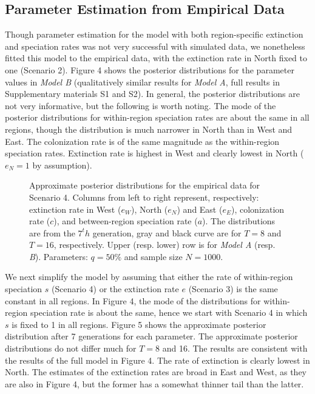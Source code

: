 \subsection*{Parameter Estimation from Empirical Data}
\noindent Though parameter estimation for the model with both region-specific extinction and speciation rates was not very successful with simulated data, we nonetheless fitted this model to the empirical data, with the extinction rate in North fixed to one (Scenario 2). 
Figure 4 shows the posterior distributions for the parameter values in \textit{Model B} (qualitatively similar results for \textit{Model A}, full results in Supplementary materials S1 and S2). 
In general, the posterior distributions are not very informative, but the following is worth noting. 
The mode of the posterior distributions for within-region speciation rates are about the same in all regions, though the distribution is much narrower in North than in West and East. 
The colonization rate is of the same magnitude as the within-region speciation rates.  
Extinction rate is highest in West and clearly lowest in North ($e_N=1$ by assumption).  
%
\begin{figure*}[t]
\begin{center}
\caption{Approximate posterior distributions for the empirical data for Scenario 4. 
	Columns from left to right represent, respectively: extinction rate in West ($e_W$), North ($e_N$) and East ($e_E$), colonization rate ($c$), and between-region speciation rate ($a$).
	The distributions are from the $7^th$ generation, gray and black curve are for $T = 8$ and $T = 16$, respectively. 
	Upper (resp. lower) row is for \textit{Model A} (resp. \textit{B}). 
	Parameters: $q = 50\%$ and sample size $N = 1000$.}
\label{fig:5}
\vspace{-0.2in}
\end{center}
\end{figure*}
%
We next simplify the model by assuming that either the rate of within-region speciation $s$ (Scenario 4) or the extinction rate $e$ (Scenario 3) is the same constant in all regions. 
In Figure 4, the mode of the distributions for within-region speciation rate is about the same, hence we start with Scenario 4 in which $s$ is fixed to 1 in all regions. 
Figure 5 shows the approximate posterior distribution after 7 generations for each parameter. 
The approximate posterior distributions do not differ much for $T= 8$ and 16. 
The results are consistent with the results of the full model in Figure 4. 
The rate of extinction is clearly lowest in North. 
The estimates of the extinction rates are broad in East and West, as they are also in Figure 4, but the former has a somewhat thinner tail than the latter.

